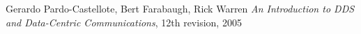 \begin{thebibliography}{9}

Gerardo Pardo-Castellote, Bert Farabaugh, Rick Warren
\emph{An Introduction to DDS and Data-Centric Communications}, 12th revision, 2005

\end{thebibliography} 